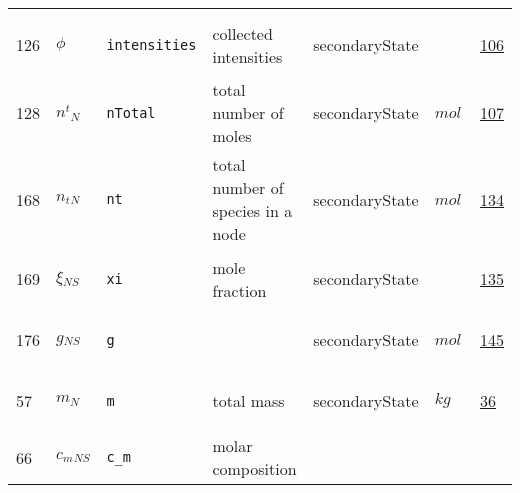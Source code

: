 \begin{longtable}{|p{1cm}|p{2.5cm}|p{4.5cm}|p{8cm}|p{3.0cm}|p{3cm}|p{1cm}|}
             & \\
            126
             & \hypertarget{"v:126"}{ $ {\phi}{_{}} $}
             & \verb|intensities|
             & collected intensities
             & \begin{lay}secondaryState \end{lay}
             & $  $
             &                 \hyperlink{"e:106"}{ 106 }
                 \\
            128
             & \hypertarget{"v:128"}{ $ {{n^t}}{_{N}} $}
             & \verb|nTotal|
             & total number of moles
             & \begin{lay}secondaryState \end{lay}
             & $ mol \, $
             &                 \hyperlink{"e:107"}{ 107 }
                 \\
            168
             & \hypertarget{"v:168"}{ $ {n_t}{_{N}} $}
             & \verb|nt|
             & total number of species in a node
             & \begin{lay}secondaryState \end{lay}
             & $ mol \, $
             &                 \hyperlink{"e:134"}{ 134 }
                 \\
            169
             & \hypertarget{"v:169"}{ $ {\xi}{_{{N S}}} $}
             & \verb|xi|
             & mole fraction
             & \begin{lay}secondaryState \end{lay}
             & $  $
             &                 \hyperlink{"e:135"}{ 135 }
                 \\
            176
             & \hypertarget{"v:176"}{ $ {g}{_{{N S}}} $}
             & \verb|g|
             & 
             & \begin{lay}secondaryState \end{lay}
             & $ mol \, $
             &                 \hyperlink{"e:145"}{ 145 }
                 \\
            57
             & \hypertarget{"v:57"}{ $ {m}{_{N}} $}
             & \verb|m|
             & total mass
             & \begin{lay}secondaryState \end{lay}
             & $ kg \, $
             &                 \hyperlink{"e:36"}{ 36 }
                 \\
            66
             & \hypertarget{"v:66"}{ $ {c_m}{_{{N S}}} $}
             & \verb|c_m|
             & molar composition

\end{longtable}
